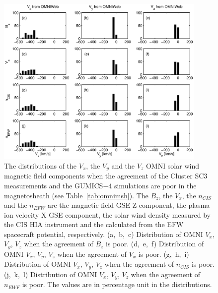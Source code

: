 \documentclass[linenumbers,draft]{agujournal}
\begin{document}
\begin{figure}[h]
\centering
\includegraphics[width=0.9\textwidth,angle=0]{swe-2020-corr-f18.eps}
\caption{The distributions of the $V_{x}$, the $V_{y}$  and the $V_{z}$ OMNI solar wind magnetic field components when the agreement of the Cluster SC3 measurements and the GUMICS$-$4 simulations are poor in the magnetosheath (see Table~\ref{tab:omnimsh}). The $B_{z}$, the $V_{x}$, the $n_{CIS}$ and the $n_{EFW}$ are the magnetic field GSE Z component, the plasma ion velocity X GSE component, the  solar wind density measured by the CIS HIA instrument and the calculated from the EFW spacecraft potential, respectively. (a,~b,~c) Distribution of OMNI $V_{x}$, $V_{y}$, $V_{z}$ when the agreement of $B_{z}$ is poor. (d,~e,~f) Distribution of OMNI  $V_{x}$, $V_{y}$, $V_{z}$ when the agreement of $V_{x}$ is poor. (g,~h,~i) Distribution of OMNI $V_{x}$, $V_{y}$, $V_{z}$ when the agreement of $n_{CIS}$ is poor. (j,~k,~l) Distribution of OMNI $V_{x}$, $V_{y}$, $V_{z}$ when the agreement of $n_{EWF}$ is poor. The values are in percentage unit in the distributions.}
\label{fig:mshomnivxyz}
\end{figure}

\pagebreak
\end{document}
